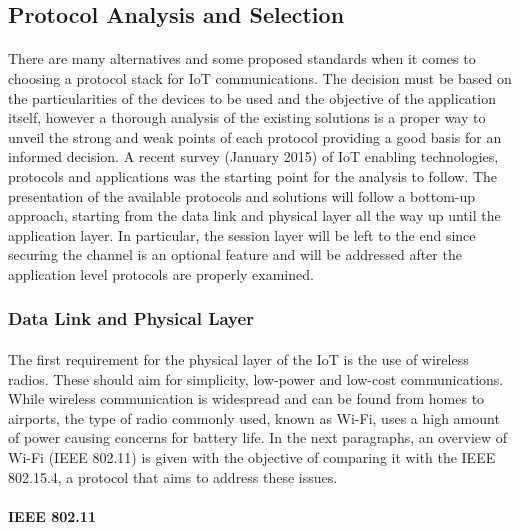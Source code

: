 \subsection{Protocol Analysis and Selection}
\label{sec:protocol_analysis}

\paragraph{}
There are many alternatives and some proposed standards when it comes to choosing a protocol stack for \ac{IoT} communications. The decision must be based on the particularities of the devices to be used and the objective of the application itself, however a thorough analysis of the existing solutions is a proper way to unveil the strong and weak points of each protocol providing a good basis for an informed decision. A recent survey (January 2015) \cite{Al-Fuqaha2015} of \ac{IoT} enabling technologies, protocols and applications was the starting point for the analysis to follow. The presentation of the available protocols and solutions will follow a bottom-up approach, starting from the data link and physical layer all the way up until the application layer. In particular, the session layer will be left to the end since securing the channel is an optional feature and will be addressed after the application level protocols are properly examined.

\subsubsection{Data Link and Physical Layer}

\paragraph{}
The first requirement for the physical layer of the \ac{IoT} is the use of wireless radios. These should aim for simplicity, low-power and low-cost communications. While wireless communication is widespread and can be found from homes to airports, the type of radio commonly used, known as Wi-Fi, uses a high amount of power causing concerns for battery life. In the next paragraphs, an overview of Wi-Fi (IEEE 802.11) is given with the objective of comparing it with the IEEE 802.15.4, a protocol that aims to address these issues.

\paragraph{\textbf{IEEE 802.11}}
